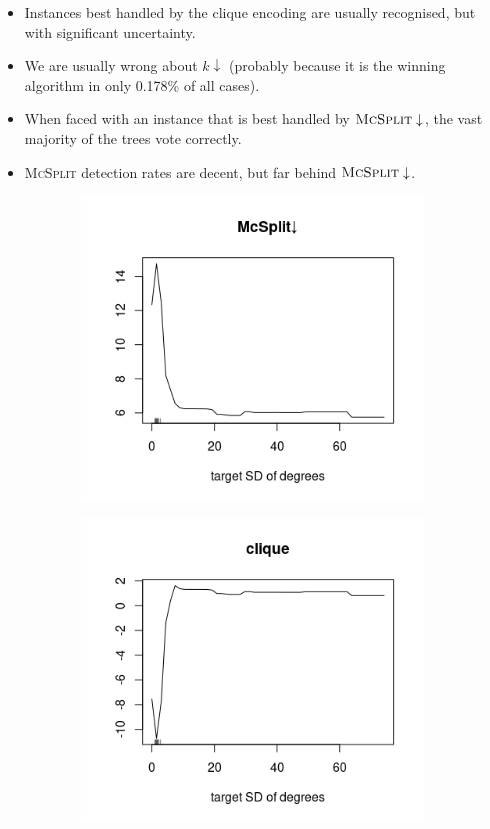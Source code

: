 \documentclass{l4proj}
\theoremstyle{definition}
\theoremstyle{remark}
\begin{document}
\begin{itemize}
\item Instances best handled by the clique encoding are usually recognised, but
  with significant uncertainty.
\item We are usually wrong about $k\downarrow$ (probably because it is the
  winning algorithm in only 0.178\% of all cases).
\item When faced with an instance that is best handled by
  $\textsc{McSplit}\downarrow$, the vast majority of the trees vote correctly.
\item \textsc{McSplit} detection rates are decent, but far behind
  $\textsc{McSplit}\downarrow$.
\end{itemize}

\begin{figure}
  \centering
  \begin{subfigure}[t]{0.49\textwidth}
    \centering
    \includegraphics[scale=0.7]{images/mcsplit_partial.png}
  \end{subfigure}
  \begin{subfigure}[t]{0.49\textwidth}
    \centering
    \includegraphics[scale=0.7]{images/clique_partial.png}

\end{subfigure}
\end{figure}
\end{document}
